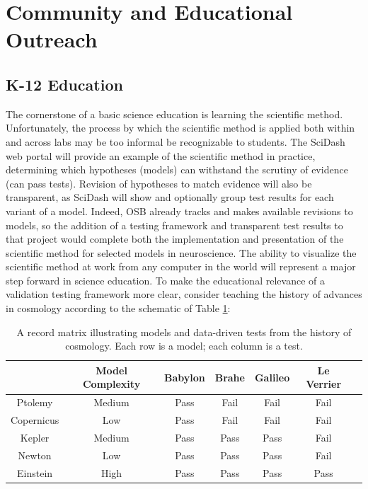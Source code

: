 \documentclass[a4paper,12pt]{article}
\begin{document}
\section{Community and Educational Outreach}
\subsection{K-12 Education}
The cornerstone of a basic science education is learning the scientific method.  Unfortunately, the process by which the scientific method is applied both within and across labs may be too informal be recognizable to students.  The SciDash web portal will provide an example of the scientific method in practice, determining which hypotheses (models) can withstand the scrutiny of evidence (can pass tests).  Revision of hypotheses to match evidence will also be transparent, as SciDash will show and optionally group test results for each variant of a model.  Indeed, OSB already tracks and makes available revisions to models, so the addition of a testing framework and transparent test results to that project would complete both the implementation and presentation of the scientific method for selected models in neuroscience.  The ability to visualize the scientific method at work from any computer in the world will represent a major step forward in science education.  
To make the educational relevance of a validation testing framework more clear, consider teaching the history of advances in cosmology according 
to the schematic of Table \ref{table:record_matrix}:  

\begin{table}[h]
\caption{A record matrix illustrating models and data-driven tests from the history of cosmology.  Each row is a model; each column is a test.}
\label{table:record_matrix}
\begin{tabular}{| c | c | c | c | c | c | c |}
\hline
		& Model Complexity & Babylon & Brahe & Galileo & Le Verrier \\ \hline
	Ptolemy & Medium & Pass & Fail & Fail & Fail \\ \hline
	Copernicus & Low & Pass & Fail & Fail & Fail \\ \hline
	Kepler & Medium & Pass & Pass & Pass & Fail \\ \hline
	Newton & Low & Pass & Pass & Pass & Fail \\ \hline
	Einstein & High & Pass & Pass & Pass & Pass \\ \hline
\end{tabular}
\end{table}
\end{document}
